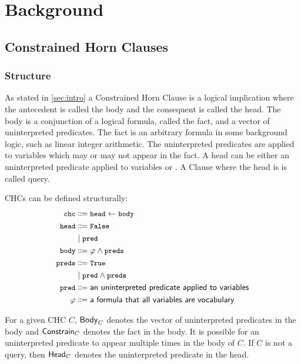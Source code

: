 \section{Background}
\label{sec:background}

\subsection{Constrained Horn Clauses}
\label{sec:chcs}

\subsubsection{Structure}
As stated in \autoref{sec:intro} a Constrained Horn Clause is a
logical implication where the antecedent is called the body and the
consequent is called the head.
%
The body is a conjunction of a logical formula, called the fact,
and a vector of uninterpreted predicates. The fact is an arbitrary
formula in some background logic, such as linear integer arithmetic.
%
The uninterpreted predicates are applied to variables which may or may
not appear in the fact.
%
A head can be either an uninterpreted predicate applied to variables or .
%
A Clause where the head is  is called query.
\begin{defn}
  CHCs can be defined structurally:
\begin{align*}
  \cc{chc} &\Coloneqq \cc{head} \gets \cc{body} \\
  \cc{head} &\Coloneqq \cc{False} \\&\mid \cc{pred}  \\
  \cc{body} &\Coloneqq \varphi \wedge \cc{preds} \\
  \cc{preds} &\Coloneqq \cc{True} \\&\mid \cc{pred} \wedge \cc{preds} \\
  \cc{pred} &\Coloneqq \textsf{an uninterpreted predicate applied to variables} \\
  \varphi &\Coloneqq \textsf{a formula that all variables are vocabulary} \\
\end{align*}
\end{defn}
%
For a given CHC $C$, $\mathsf{Body}_{C}$ denotes the vector of uninterpreted
predicates in the body and $\mathsf{Constrain}_{C}$ denotes the fact in the
body.
%
It is possible for an uninterpreted predicate to appear multiple times
in the body of $C$.
%
If $C$ is not a query, then $\mathsf{Head}_{C}$ denotes the uninterpreted
predicate in the head.
%

